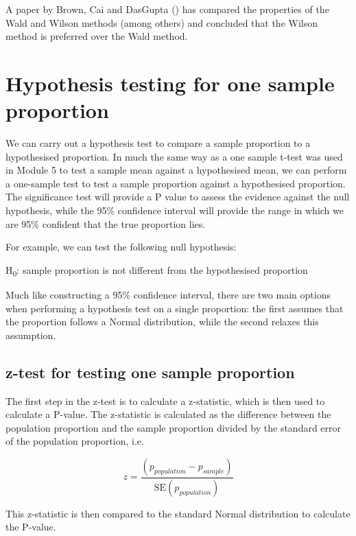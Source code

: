 \documentclass[
]{memoir}
\begin{document}
A paper by Brown, Cai and DasGupta (\citet{brown_etal01}) has compared the properties of the Wald and Wilson methods (among others) and concluded that the Wilson method is preferred over the Wald method.

\hypertarget{hypothesis-testing-for-one-sample-proportion}{%
\section{Hypothesis testing for one sample proportion}\label{hypothesis-testing-for-one-sample-proportion}}

We can carry out a hypothesis test to compare a sample proportion to a hypothesised proportion. In much the same way as a one sample t-test was used in Module 5 to test a sample mean against a hypothesised mean, we can perform a one-sample test to test a sample proportion against a hypothesised proportion. The significance test will provide a P value to assess the evidence against the null hypothesis, while the 95\% confidence interval will provide the range in which we are 95\% confident that the true proportion lies.

For example, we can test the following null hypothesis:

H\textsubscript{0}: sample proportion is not different from the hypothesised proportion

Much like constructing a 95\% confidence interval, there are two main options when performing a hypothesis test on a single proportion: the first assumes that the proportion follows a Normal distribution, while the second relaxes this assumption.

\hypertarget{z-test-for-testing-one-sample-proportion}{%
\subsection{z-test for testing one sample proportion}\label{z-test-for-testing-one-sample-proportion}}

The first step in the z-test is to calculate a z-statistic, which is then used to calculate a P-value. The z-statistic is calculated as the difference between the population proportion and the sample proportion divided by the standard error of the population proportion, i.e.

\[
z = \frac{(p_{population} - p_{sample})}{\text{SE}(p_{population})}
\]

This z-statistic is then compared to the standard Normal distribution to calculate the P-value.
\end{document}
